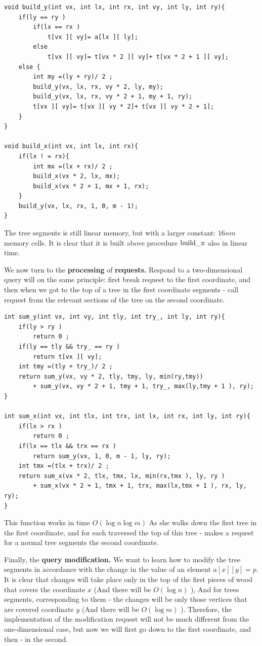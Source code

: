 \begin{verbatim}
void build_y(int vx, int lx, int rx, int vy, int ly, int ry){
    if(ly == ry )
        if(lx == rx )
            t[vx ][ vy]= a[lx ][ ly];
        else
            t[vx ][ vy]= t[vx * 2 ][ vy]+ t[vx * 2 + 1 ][ vy];
    else {
        int my =(ly + ry)/ 2 ;
        build_y(vx, lx, rx, vy * 2, ly, my);
        build_y(vx, lx, rx, vy * 2 + 1, my + 1, ry);
        t[vx ][ vy]= t[vx ][ vy * 2]+ t[vx ][ vy * 2 + 1];
    }
}
 
void build_x(int vx, int lx, int rx){
    if(lx ! = rx){
        int mx =(lx + rx)/ 2 ;
        build_x(vx * 2, lx, mx);
        build_x(vx * 2 + 1, mx + 1, rx);
    }
    build_y(vx, lx, rx, 1, 0, m - 1);
} 
\end{verbatim}
The tree segments is still linear memory, but with a larger constant: $16 n m$ memory cells. It is clear that it is built above procedure $\rm build \_x$ also in linear time.

We now turn to the \textbf{processing} of \textbf{requests.} Respond to a two-dimensional query will on the same principle: first break request to the first coordinate, and then when we got to the top of a tree in the first coordinate segments - call request from the relevant sections of the tree on the second coordinate.

\begin{verbatim}
int sum_y(int vx, int vy, int tly, int try_, int ly, int ry){
    if(ly > ry )
        return 0 ;
    if(ly == tly && try_ == ry )
        return t[vx ][ vy];
    int tmy =(tly + try_)/ 2 ;
    return sum_y(vx, vy * 2, tly, tmy, ly, min(ry,tmy))
        + sum_y(vx, vy * 2 + 1, tmy + 1, try_, max(ly,tmy + 1 ), ry);
}
 
int sum_x(int vx, int tlx, int trx, int lx, int rx, int ly, int ry){
    if(lx > rx )
        return 0 ;
    if(lx == tlx && trx == rx )
        return sum_y(vx, 1, 0, m - 1, ly, ry);
    int tmx =(tlx + trx)/ 2 ;
    return sum_x(vx * 2, tlx, tmx, lx, min(rx,tmx ), ly, ry )
        + sum_x(vx * 2 + 1, tmx + 1, trx, max(lx,tmx + 1 ), rx, ly, ry);
} 
\end{verbatim}
This function works in time $O (\log n \log m)$ As she walks down the first tree in the first coordinate, and for each traversed the top of this tree - makes a request for a normal tree segments the second coordinate.

Finally, the \textbf{query modification.} We want to learn how to modify the tree segments in accordance with the change in the value of an element $a [x][y] = p$. It is clear that changes will take place only in the top of the first pieces of wood that covers the coordinate $x$ (And there will be $O (\log n)$ ), And for trees segments, corresponding to them - the changes will be only those vertices that are covered coordinate $y$ (And there will be $O (\log m)$ ). Therefore, the implementation of the modification request will not be much different from the one-dimensional case, but now we will first go down to the first coordinate, and then - in the second.

